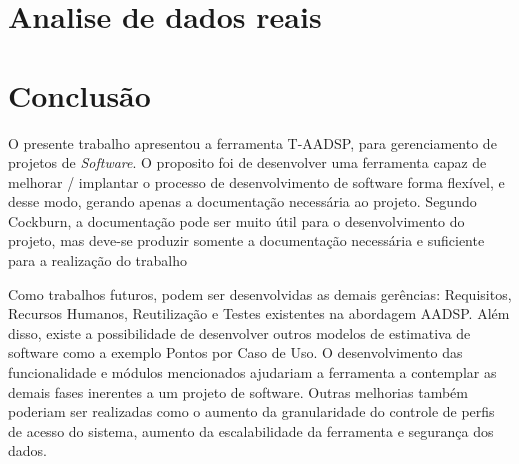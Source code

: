 \documentclass{acm_proc_article-sp}
\begin{document}
\section{Analise de dados reais}


\section{Conclusão}
O presente trabalho apresentou a ferramenta T-AADSP, para gerenciamento de projetos de \textit{Software}. O proposito foi de desenvolver uma ferramenta capaz de melhorar / implantar o processo de desenvolvimento de software forma flexível, e desse modo, gerando apenas a documentação necessária ao projeto.  Segundo Cockburn, a documentação pode ser muito útil para o desenvolvimento
do projeto, mas deve-se produzir somente a documentação necessária e suficiente para a realização do trabalho \cite{agil:Cockburn}

Como trabalhos futuros, podem ser desenvolvidas as demais gerências: Requisitos, Recursos Humanos, Reutilização e Testes existentes na abordagem AADSP. Além disso, existe a possibilidade de desenvolver outros modelos de estimativa de software como a exemplo Pontos por Caso de Uso. O desenvolvimento das funcionalidade e módulos mencionados ajudariam a ferramenta a contemplar as demais fases inerentes a um projeto de software. Outras melhorias também poderiam ser realizadas como o aumento da granularidade do controle de perfis de acesso do sistema, aumento da escalabilidade da ferramenta e segurança dos dados.




\end{document}
